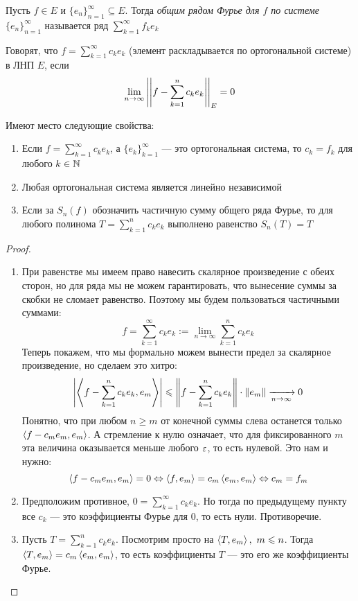 \begin{definition}
	Пусть $f \in E$ и $\{e_n\}_{n = 1}^\infty \subseteq E$. Тогда \textit{общим рядом Фурье для $f$ по системе $\{e_n\}_{n = 1}^\infty$} называется ряд $\sum_{k = 1}^\infty f_ke_k$
\end{definition}

\begin{definition}
	Говорят, что $f = \sum_{k = 1}^\infty c_ke_k$ (элемент раскладывается по ортогональной системе) в ЛНП $E$, если
	\[
		\lim_{n \to \infty} \left|\left|f - \sum_{k = 1}^n c_ke_k\right|\right|_E = 0
	\]
\end{definition}

\begin{proposition}
	Имеют место следующие свойства:
	\begin{enumerate}
		\item Если $f = \sum_{k = 1}^\infty c_ke_k$, а $\{e_k\}_{k = 1}^\infty$ --- это ортогональная система, то $c_k = f_k$ для любого $k \in \mathbb{N}$
		
		\item Любая ортогональная система является линейно независимой
		
		\item Если за $S_n(f)$ обозначить частичную сумму общего ряда Фурье, то для любого полинома $T = \sum_{k = 1}^n c_ke_k$ выполнено равенство $S_n(T) = T$
	\end{enumerate}
\end{proposition}

\begin{proof}~
	\begin{enumerate}
		\item При равенстве мы имеем право навесить скалярное произведение с обеих сторон, но для ряда мы не можем гарантировать, что вынесение суммы за скобки не сломает равенство. Поэтому мы будем пользоваться частичными суммами:
		\[
			f = \sum_{k = 1}^\infty c_ke_k := \lim_{n \to \infty} \sum_{k = 1}^n c_ke_k
		\]
		Теперь покажем, что мы формально можем вынести предел за скалярное произведение, но сделаем это хитро:
		\[
			\left|\left\langle f - \sum_{k = 1}^n c_ke_k, e_m\right\rangle\right| \leqslant \left\|f - \sum_{k = 1}^n c_ke_k\right\| \cdot \|e_m\| \xrightarrow[n \to \infty]{} 0
		\]
		Понятно, что при любом $n \ge m$ от конечной суммы слева останется только $\left\langle f - c_m e_m, e_m\right\rangle$. А стремление к нулю означает, что для фиксированного $m$ эта величина оказывается меньше любого $\varepsilon$, то есть нулевой. Это нам и нужно:
		\[
			\left\langle f - c_m e_m, e_m\right\rangle = 0 \Leftrightarrow \left\langle f, e_m\right\rangle = c_m\left\langle e_m, e_m\right\rangle \Leftrightarrow c_m = f_m
		\]
		
		\item Предположим противное, $0 = \sum_{k = 1}^\infty c_ke_k$. Но тогда по предыдущему пункту все $c_k$ --- это коэффициенты Фурье для 0, то есть нули. Противоречие.
		
		\item Пусть $T = \sum_{k = 1}^n c_ke_k$. Посмотрим просто на $\left\langle T, e_m\right\rangle,\ m \leqslant n$. Тогда $\left\langle T, e_m\right\rangle = c_m\left\langle e_m, e_m\right\rangle$, то есть коэффициенты $T$ --- это его же коэффициенты Фурье.
	\end{enumerate}
\end{proof}

